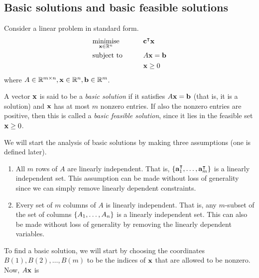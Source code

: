 \subsection{Basic solutions and basic feasible solutions}
Consider a linear problem in standard form.
\begin{alignat*}{2}
	 & \underset{\vb x \in \mathbb R^n}{\text{minimise}} & \qquad & \vb c^\intercal \vb x \\
	 & \text{subject to}                                 &        & A\vb x = \vb b         \\
	 &                                                   &        & \vb x \geq 0
\end{alignat*}
where \( A \in \mathbb R^{m \times n}, \vb x \in \mathbb R^n, \vb b \in \mathbb R^m \).
\begin{definition}
	A vector \( \vb x \) is said to be a \textit{basic solution} if it satisfies \( A \vb x = \vb b \) (that is, it is a solution) and \( \vb x \) has at most \( m \) nonzero entries.
	If also the nonzero entries are positive, then this is called a \textit{basic feasible solution}, since it lies in the feasible set \( \vb x \geq 0 \).
\end{definition}
We will start the analysis of basic solutions by making three assumptions (one is defined later).
\begin{enumerate}[A:]
	\item All \( m \) rows of \( A \) are linearly independent.
	      That is, \( \qty{ \vb a_1^\intercal, \dots, \vb a_m^\intercal} \) is a linearly independent set.
	      This assumption can be made without loss of generality since we can simply remove linearly dependent constraints.
	\item Every set of \( m \) columns of \( A \) is linearly independent.
	      That is, any \( m \)-subset of the set of columns \( \qty{ A_1, \dots, A_n } \) is a linearly independent set.
	      This can also be made without loss of generality by removing the linearly dependent variables.
\end{enumerate}
To find a basic solution, we will start by choosing the coordinates \( B(1), B(2), \dots, B(m) \) to be the indices of \( \vb x \) that are allowed to be nonzero.
Now, \( A \vb x \) is
